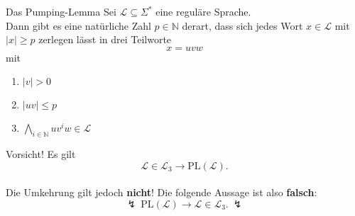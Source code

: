 \documentclass[]{beamer}
\begin{document}
\begin{frame}[squeeze]{}
  \begin{block}{Das Pumping-Lemma}
    Sei $\mathcal{L} \subseteq \Sigma^*$ eine reguläre Sprache. \\
    Dann gibt es eine natürliche Zahl $p \in \mathbb{N}$ derart, dass sich jedes Wort $x \in \mathcal{L}$ mit $|x| \geq p$ zerlegen lässt in drei Teilworte
    \vspace*{-0.5em}
      \[x = uvw\]
    \vspace*{-0.5em}
    mit
    \begin{enumerate}
      \item $|v| > 0$
      \item $|uv| \leq p$
      \item $\underset{i \in \mathbb{N}}{\bigwedge} uv^iw \in \mathcal{L}$
    \end{enumerate}
  \end{block}
  
  \vspace*{-0.5em}
  \pause
  
  \begin{alertblock}{Vorsicht!}
    Es gilt
    \vspace*{-0.5em}
    \[\mathcal{L} \in \mathcal{L}_3 \rightarrow \mathrm{PL} \left( \mathcal{L} \right).\]\\
    \vspace*{0.5em}
    Die Umkehrung gilt jedoch \textbf{nicht}! Die folgende Aussage ist also \textbf{falsch}:
    \vspace*{-0.5em}
    \[\lightning ~ \mathrm{PL} \left( \mathcal{L} \right) \rightarrow \mathcal{L} \in \mathcal{L}_3. ~ \lightning\]
  \end{alertblock}
\end{frame}
\end{document}
